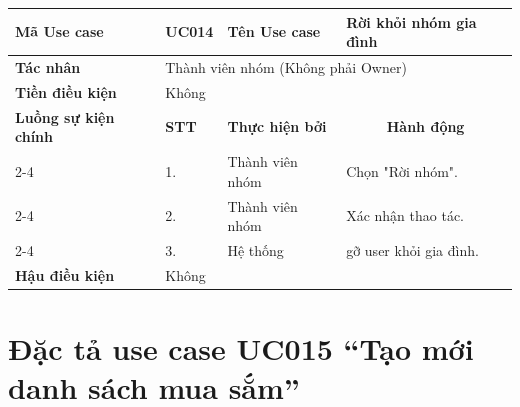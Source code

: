 \begin{longtable}{|p{2.7cm}|p{0.8cm}|p{2.6cm}|p{7.3cm}|}
\hline
\cellcolor[HTML]{D5F5E3}\textbf{Mã Use case} & \multicolumn{1}{l|}{UC014} & \cellcolor[HTML]{D5F5E3}\textbf{Tên Use case} & Rời khỏi nhóm gia đình \\ \hline
\cellcolor[HTML]{D5F5E3}\textbf{Tác nhân} & \multicolumn{3}{p{10.7cm}|}{Thành viên nhóm (Không phải Owner)} \\ \hline
\cellcolor[HTML]{D5F5E3}\textbf{Tiền điều kiện} & \multicolumn{3}{p{10.7cm}|}{Không} \\ \hline

\cellcolor[HTML]{D5F5E3}\textbf{Luồng sự kiện chính} & \cellcolor[HTML]{FDEBD0}\textbf{STT} & \cellcolor[HTML]{FDEBD0}\textbf{Thực hiện bởi} & \multicolumn{1}{c|}{\cellcolor[HTML]{FDEBD0}\textbf{Hành động}} \\ \cline{2-4} 
\cellcolor[HTML]{D5F5E3} & 1. & Thành viên nhóm & Chọn "Rời nhóm". \\ \cline{2-4} 
\cellcolor[HTML]{D5F5E3} & 2. & Thành viên nhóm & Xác nhận thao tác. \\ \cline{2-4} 
\cellcolor[HTML]{D5F5E3} & 3. & Hệ thống & gỡ user khỏi gia đình. \\ \hline

\cellcolor[HTML]{D5F5E3}\textbf{Hậu điều kiện} & \multicolumn{3}{p{10.7cm}|}{Không} \\ \hline
\end{longtable}
\endgroup

\section{Đặc tả use case UC015 ``Tạo mới danh sách mua sắm''}
\vspace{0.5cm}

\begingroup
\renewcommand{\arraystretch}{1.5}

